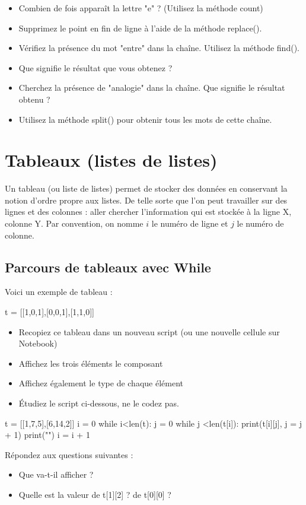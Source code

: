 
\begin{itemize}
  \item Combien de fois apparaît la lettre "e" ? (Utilisez la méthode count)
  \item Supprimez le point en fin de ligne à l'aide de la méthode replace().
  \item Vérifiez la présence du mot "entre" dans la chaîne. Utilisez la méthode find().
  \item Que signifie le résultat que vous obtenez ?
  \item Cherchez la présence de "analogie" dans la chaîne. Que signifie le résultat obtenu ?
  \item Utilisez la méthode split() pour obtenir tous les mots de cette chaîne.
\end{itemize}

\section{Tableaux (listes de listes)}
Un tableau (ou liste de listes) permet de stocker des données en conservant la notion d'ordre propre aux listes.
De telle sorte que l'on peut travailler sur des lignes et des colonnes : aller chercher l'information qui est stockée à la ligne X, colonne Y. Par convention, on nomme $i$ le numéro de ligne et $j$ le numéro de colonne.

\subsection{Parcours de tableaux avec While}

\exer
Voici un exemple de tableau :

\begin{python}
t = [[1,0,1],[0,0,1],[1,1,0]]
\end{python}

\begin{itemize}
  \item Recopiez ce tableau dans un nouveau script (ou une nouvelle cellule sur Notebook)
  \item Affichez les trois éléments le composant
  \item Affichez également le type de chaque élément
\end{itemize}


\begin{itemize}
\item Étudiez le script ci-dessous, ne le codez pas.
\end{itemize}
\begin{python}
t = [[1,7,5],[6,14,2]]
i = 0
while i<len(t):
  j = 0
  while j <len(t[i]):
    print(t[i][j],
    j = j + 1)
  print("")
  i = i + 1
\end{python}
Répondez aux questions suivantes :
\begin{itemize}
 \item Que va-t-il afficher ?
 \item Quelle est la valeur de t[1][2] ? de t[0][0] ?
\end{itemize}


